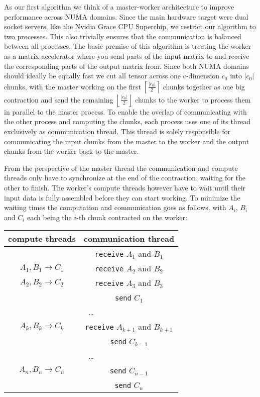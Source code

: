 As our first algorithm we think of a master-worker architecture to improve performance across NUMA domains.
Since the main hardware target were dual socket servers, like the Nvidia Grace CPU Superchip, we restrict our algorithm to two processes.
This also trivially ensures that the communication is balanced between all processes.
The basic premise of this algorithm is treating the worker as a matrix accelerator where you send parts of the input matrix to and receive the corresponding parts of the output matrix from.
Since both NUMA domains should ideally be equally fast we cut all tensor across one c-dimension $c_0$ into $|c_0|$ chunks, with the master working on the first $\left \lceil{\frac{|c_0|}{2}}\right \rceil $ chunks together as one big contraction and send the remaining  $\left \lfloor{\frac{|c_0|}{2}}\right \rfloor$ chunks to the worker to process them in parallel to the master process.
To enable the overlap of communicating with the other process and computing the chunks, each process uses one of its thread exclusively as communication thread.
This thread is solely responsible for communicating the input chunks from the master to the worker and the output chunks from the worker back to the master.

From the perspective of the master thread the communication and compute threads only have to synchronize at the end of the contraction, waiting for the other to finish.
The worker's compute threads however have to wait until their input data is fully assembled before they can start working.
To minimize the waiting times the computation and communication goes as follows, with $A_i$, $B_i$ and $C_i$ each being the $i$-th chunk contracted on the worker:

\begin{center}
  \begin{tabular}{ |c|c| } 
  \hline
  compute threads & communication thread\\
  \hline
   & \texttt{receive} $A_1$ and $B_1$\\
  \hline
  $A_1,B_1 \rightarrow C_1$ & \texttt{receive} $A_2$ and $B_2$\\
  \hline
  $A_2,B_2 \rightarrow C_2$ & \texttt{receive} $A_3$ and $B_3$\\
  & \texttt{send} $C_1$\\
  \hline
  \multicolumn{2}{|c|}{\dots}\\
  \hline
  $A_k,B_k \rightarrow C_k$ & \texttt{receive} $A_{k+1}$ and $B_{k+1}$\\
  & \texttt{send} $C_{k-1}$\\
  \hline
  \multicolumn{2}{|c|}{\dots}\\
  \hline
  $A_n,B_n \rightarrow C_n$ & \texttt{send} $C_{n-1}$\\
  \hline
  & \texttt{send} $C_n$\\
  \hline
\end{tabular}
\end{center}

